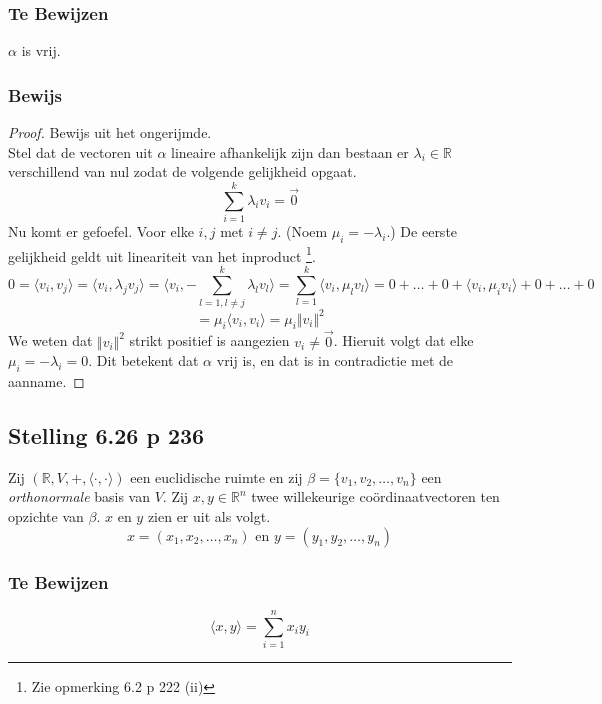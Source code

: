 \documentclass[lineaire_algebra_oplossingen.tex]{subfiles}
\begin{document}
\subsubsection*{Te Bewijzen}
$\alpha$ is vrij.

\subsubsection*{Bewijs}
\begin{proof}
Bewijs uit het ongerijmde.\\
Stel dat de vectoren uit $\alpha$ lineaire afhankelijk zijn dan bestaan er $\lambda_i \in \mathbb{R}$ verschillend van nul zodat de volgende gelijkheid opgaat.
\[
\sum_{i=1}^k \lambda_iv_i = \vec{0}
\]
Nu komt er gefoefel. Voor elke $i, j$ met $i\neq j$. (Noem $\mu_i =-\lambda_i $.)
De eerste gelijkheid geldt uit lineariteit van het inproduct \footnote{Zie opmerking 6.2 p 222 (ii)}.
\[
0 = \langle v_i, v_j \rangle = \langle v_i, \lambda_jv_j \rangle = \langle v_i, -\sum_{l=1, l\neq j}^k \lambda_lv_l \rangle = \sum_{l= 1}^k\langle v_i, \mu_lv_l\rangle = 0 + \ldots + 0 + \langle v_i,\mu_i v_i\rangle + 0 + \ldots + 0
\]
\[
= \mu_i \langle v_i,v_i\rangle = \mu_i \Vert v_i\Vert^2
\]
We weten dat $\Vert v_i\Vert^2$ strikt positief is aangezien $v_i \neq \vec{0}$. Hieruit volgt dat elke $\mu_i = -\lambda_i = 0$. Dit betekent dat $\alpha$ vrij is, en dat is in contradictie met de aanname.
\end{proof}


\subsection{Stelling 6.26 p 236}
\label{6.26}
Zij $(\mathbb{R}, V,+, \langle \cdot,\cdot \rangle)$ een euclidische ruimte en zij $\beta = \{v_1,v_2,\ldots,v_n\}$ een \emph{orthonormale} basis van $V$. Zij $x,y\in \mathbb{R}^n$ twee willekeurige co\"ordinaatvectoren ten opzichte van $\beta$. $x$ en $y$ zien er uit als volgt.
\[
x = (x_1,x_2,\ldots,x_n) \text { en } y = (y_1,y_2,\ldots,y_n)
\]

\subsubsection*{Te Bewijzen}
\[
\langle x,y\rangle = \sum_{i=1}^nx_iy_i
\]
\end{document}
